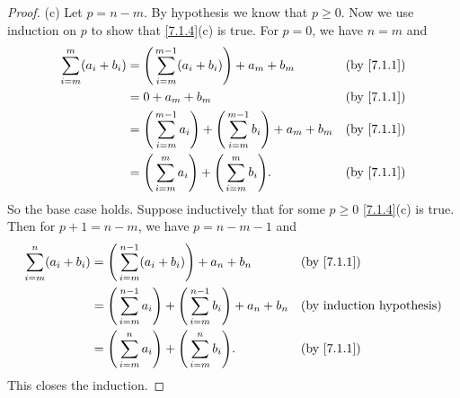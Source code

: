 \begin{proof}{(c)}
  Let \(p = n - m\).
  By hypothesis we know that \(p \geq 0\).
  Now we use induction on \(p\) to show that \cref{7.1.4}(c) is true.
  For \(p = 0\), we have \(n = m\) and
  \begin{align*}
    \sum_{i = m}^m (a_i + b_i) & = \Bigg(\sum_{i = m}^{m - 1} (a_i + b_i)\Bigg) + a_m + b_m                                &  & \by{7.1.1} \\
                               & = 0 + a_m + b_m                                                                           &  & \by{7.1.1} \\
                               & = \Bigg(\sum_{i = m}^{m - 1} a_i\Bigg) + \Bigg(\sum_{i = m}^{m - 1} b_i\Bigg) + a_m + b_m &  & \by{7.1.1} \\
                               & = \Bigg(\sum_{i = m}^m a_i\Bigg) + \Bigg(\sum_{i = m}^m b_i\Bigg).                        &  & \by{7.1.1}
  \end{align*}
  So the base case holds.
  Suppose inductively that for some \(p \geq 0\) \cref{7.1.4}(c) is true.
  Then for \(p + 1 = n - m\), we have \(p = n - m - 1\) and
  \begin{align*}
    \sum_{i = m}^n (a_i + b_i) & = \Bigg(\sum_{i = m}^{n - 1} (a_i + b_i)\Bigg) + a_n + b_n                                &  & \by{7.1.1} \\
                               & = \Bigg(\sum_{i = m}^{n - 1} a_i\Bigg) + \Bigg(\sum_{i = m}^{n - 1} b_i\Bigg) + a_n + b_n &  & \byIH      \\
                               & = \Bigg(\sum_{i = m}^n a_i\Bigg) + \Bigg(\sum_{i = m}^n b_i\Bigg).                        &  & \by{7.1.1}
  \end{align*}
  This closes the induction.
\end{proof}

